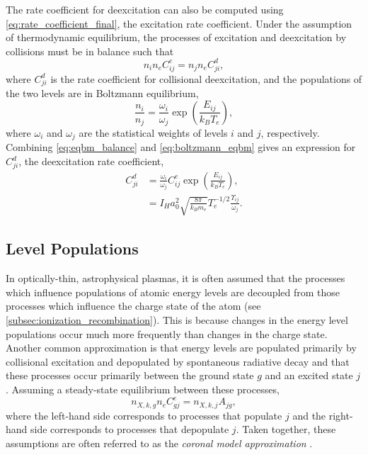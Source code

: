 The rate coefficient for deexcitation can also be computed using \autoref{eq:rate_coefficient_final}, the excitation rate coefficient. Under the assumption of thermodynamic equilibrium, the processes of excitation and deexcitation by collisions must be in balance such that 
\begin{equation}\label{eq:eqbm_balance}
    n_in_eC_{ij}^e = n_jn_eC_{ji}^d,
\end{equation}
where $C_{ji}^d$ is the rate coefficient for collisional deexcitation, and the populations of the two levels are in Boltzmann equilibrium,
\begin{equation}\label{eq:boltzmann_eqbm}
    \frac{n_i}{n_j} = \frac{\omega_i}{\omega_j}\exp{\left(\frac{E_{ij}}{k_BT_e}\right)},
\end{equation}
where $\omega_i$ and $\omega_j$ are the statistical weights of levels $i$ and $j$, respectively. Combining \autoref{eq:eqbm_balance} and \autoref{eq:boltzmann_eqbm} gives an expression for $C_{ji}^d$, the deexcitation rate coefficient,
\begin{align}\label{eq:dex_rate_coefficient}
    C_{ji}^d &= \frac{\omega_i}{\omega_j}C_{ij}^e\exp{\left(\frac{E_{ij}}{k_BT_e}\right)},\nonumber\\
    &= I_Ha_0^2\sqrt{\frac{8\pi}{k_Bm_e}}T_e^{-1/2}\frac{\Upsilon_{ij}}{\omega_j}.
\end{align}

\subsection{Level Populations}\label{subsec:level_pops}

In optically-thin, astrophysical plasmas, it is often assumed that the processes which influence populations of atomic energy levels are decoupled from those processes which influence the charge state of the atom (see \autoref{subsec:ionization_recombination}). This is because changes in the energy level populations occur much more frequently than changes in the charge state. Another common approximation is that energy levels are populated primarily by collisional excitation and depopulated by spontaneous radiative decay and that these processes occur primarily between the ground state $g$ and an excited state $j$. Assuming a steady-state equilibrium between these processes,
\begin{equation}\label{eq:coronal_model}
    n_{X,k,g}n_eC_{gj}^e = n_{X,k,j}A_{jg},
\end{equation}
where the left-hand side corresponds to processes that populate $j$ and the right-hand side corresponds to processes that depopulate $j$. Taken together, these assumptions are often referred to as the \textit{coronal model approximation} \citep{bradshaw_collisional_2013,del_zanna_solar_2018}. 

